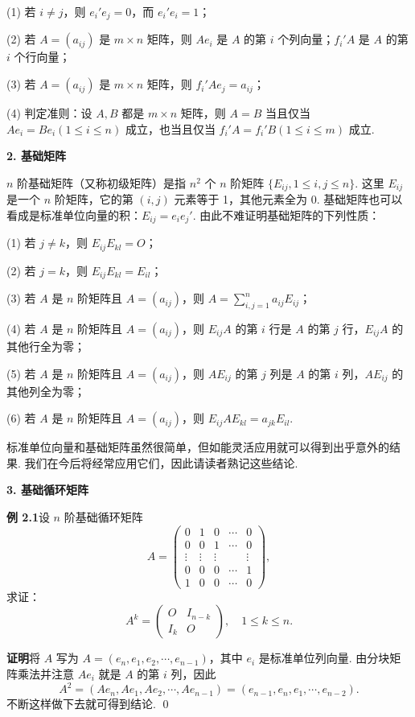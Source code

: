 \documentclass[UTF8, 12pt, fontset=fandol, oneside]{ctexart}
\begin{document}
(1) 若 $i\ne j$，则 $e_i'e_j=0$，而 $e_i'e_i=1$；

(2) 若 $A=(a_{ij})$ 是 $m\times n$ 矩阵，则 $Ae_i$ 是 $A$ 的第 $i$ 个列向量；$f_i'A$ 是 $A$ 的第 $i$ 个行向量；

(3) 若 $A=(a_{ij})$ 是 $m\times n$ 矩阵，则 $f_i'Ae_j=a_{ij}$；

(4) 判定准则：设 $A,B$ 都是 $m\times n$ 矩阵，则 $A=B$ 当且仅当 $Ae_i=Be_i(1\le i\le n)$ 成立，也当且仅当 $f_i'A=f_i'B(1\le i\le m)$ 成立.

\noindent\textbf{2. 基础矩阵}

$n$ 阶基础矩阵（又称初级矩阵）是指 $n^2$ 个 $n$ 阶矩阵 $\{E_{ij},1\le i,j\le n\}$. 这里 $E_{ij}$ 是一个 $n$ 阶矩阵，它的第 $(i,j)$ 元素等于 1，其他元素全为 0. 基础矩阵也可以看成是标准单位向量的积：$E_{ij}=e_ie_j'$. 由此不难证明基础矩阵的下列性质：

(1) 若 $j\ne k$，则 $E_{ij}E_{kl}=O$；

(2) 若 $j=k$，则 $E_{ij}E_{kl}=E_{il}$；

(3) 若 $A$ 是 $n$ 阶矩阵且 $A=(a_{ij})$，则 $A=\sum_{i,j=1}^n a_{ij}E_{ij}$；

(4) 若 $A$ 是 $n$ 阶矩阵且 $A=(a_{ij})$，则 $E_{ij}A$ 的第 $i$ 行是 $A$ 的第 $j$ 行，$E_{ij}A$ 的其他行全为零；

(5) 若 $A$ 是 $n$ 阶矩阵且 $A=(a_{ij})$，则 $AE_{ij}$ 的第 $j$ 列是 $A$ 的第 $i$ 列，$AE_{ij}$ 的其他列全为零；

(6) 若 $A$ 是 $n$ 阶矩阵且 $A=(a_{ij})$，则 $E_{ij}AE_{kl}=a_{jk}E_{il}$.

标准单位向量和基础矩阵虽然很简单，但如能灵活应用就可以得到出乎意外的结果. 我们在今后将经常应用它们，因此请读者熟记这些结论.

\noindent\textbf{3. 基础循环矩阵}

\noindent\textbf{例 2.1}\quad 设 $n$ 阶基础循环矩阵
\[
A=
\left(
\begin{array}{ccccc}
0 & 1 & 0 & \cdots & 0\\
0 & 0 & 1 & \cdots & 0\\
\vdots & \vdots & \vdots & & \vdots\\
0 & 0 & 0 & \cdots & 1\\
1 & 0 & 0 & \cdots & 0
\end{array}
\right),
\]
求证：
\[
A^k=
\left(
\begin{array}{cc}
O & I_{n-k}\\
I_k & O
\end{array}
\right),\quad 1\le k\le n.
\]

\noindent\textbf{证明}\quad 将 $A$ 写为 $A=(e_n,e_1,e_2,\cdots,e_{n-1})$，其中 $e_i$ 是标准单位列向量. 由分块矩阵乘法并注意 $Ae_i$ 就是 $A$ 的第 $i$ 列，因此
\[
A^2=(Ae_n,Ae_1,Ae_2,\cdots,Ae_{n-1})=(e_{n-1},e_n,e_1,\cdots,e_{n-2}).
\]
不断这样做下去就可得到结论. \qed
\end{document}
